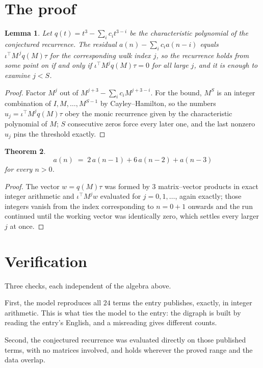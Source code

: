 \documentclass[11pt,a4paper]{article}
\theoremstyle{plain}
\newtheorem{theorem}{Theorem}
\newtheorem{lemma}[theorem]{Lemma}
\theoremstyle{definition}
\begin{document}
\section{The proof}

\begin{lemma}\label{lem:crit}
Let $q(t)=t^{3}-\sum_i c_it^{3-i}$ be the characteristic polynomial of the
conjectured recurrence. The residual $a(n)-\sum_ic_ia(n-i)$ equals
$\iota^{\!\top}M^{\,j}q(M)\tau$ for the corresponding walk index $j$, so the recurrence
holds from some point on if and only if $\iota^{\!\top}M^{j}q(M)\tau=0$ for all large $j$,
and it is enough to examine $j<S$.
\end{lemma}

\begin{proof}
Factor $M^{j}$ out of $M^{j+3}-\sum_ic_iM^{j+3-i}$. For the bound, $M^{S}$
is an integer combination of $I,M,\dots,M^{S-1}$ by Cayley--Hamilton, so the numbers
$u_j=\iota^{\!\top}M^{j}q(M)\tau$ obey the monic recurrence given by the characteristic
polynomial of $M$; $S$ consecutive zeros force every later one, and the last nonzero $u_j$
pins the threshold exactly.
\end{proof}

\begin{theorem}
\[
a(n)\;=\;2\,a(n-1) + 6\,a(n-2) + a(n-3)
\]
for every $n>0$.
\end{theorem}

\begin{proof}
The vector $w=q(M)\tau$ was formed by $3$ matrix--vector products in exact integer
arithmetic and $\iota^{\!\top}M^{j}w$ evaluated for $j=0,1,\dots$, again exactly; those
integers vanish from the index corresponding to $n=0+1$ onwards and the run continued
until the working vector was identically zero, which settles every larger $j$ at once.
\end{proof}

\section{Verification}

Three checks, each independent of the algebra above.

First, the model reproduces all $24$ terms the entry publishes, exactly, in integer
arithmetic. This is what ties the model to the entry: the digraph is built by reading the
entry's English, and a misreading gives different counts.

Second, the conjectured recurrence was evaluated directly on those published terms, with no
matrices involved, and holds wherever the proved range and the data overlap.
\end{document}
